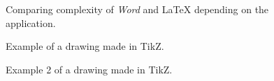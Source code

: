 \begin{figure}[!ht]
    \centering
    
    \caption{Comparing complexity of \textit{Word} and \LaTeX{} depending on the application.}\label{fig:latexeffortcomplexity}
\end{figure}

\begin{figure}[!ht]
    \centering
    
    \caption{Example of a drawing made in TikZ.}\label{fig:leaves-golden-cut}
\end{figure}

\begin{figure}[!ht]
    \centering
    
    \caption{Example 2 of a drawing made in TikZ.}\label{fig:buildchain}
\end{figure}
